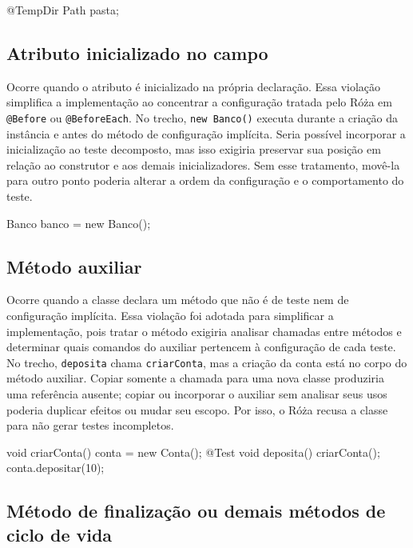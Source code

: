 \begin{violationexample}
@TempDir Path pasta;
\end{violationexample}

\subsection{Atributo inicializado no campo}

Ocorre quando o atributo é inicializado na própria declaração. Essa violação simplifica a implementação ao concentrar a configuração tratada pelo Róża em \texttt{@Before} ou \texttt{@BeforeEach}. No trecho, \texttt{new Banco()} executa durante a criação da instância e antes do método de configuração implícita. Seria possível incorporar a inicialização ao teste decomposto, mas isso exigiria preservar sua posição em relação ao construtor e aos demais inicializadores. Sem esse tratamento, movê-la para outro ponto poderia alterar a ordem da configuração e o comportamento do teste.

\begin{violationexample}
Banco banco = new Banco();
\end{violationexample}

\subsection{Método auxiliar}

Ocorre quando a classe declara um método que não é de teste nem de configuração implícita. Essa violação foi adotada para simplificar a implementação, pois tratar o método exigiria analisar chamadas entre métodos e determinar quais comandos do auxiliar pertencem à configuração de cada teste. No trecho, \texttt{deposita} chama \texttt{criarConta}, mas a criação da conta está no corpo do método auxiliar. Copiar somente a chamada para uma nova classe produziria uma referência ausente; copiar ou incorporar o auxiliar sem analisar seus usos poderia duplicar efeitos ou mudar seu escopo. Por isso, o Róża recusa a classe para não gerar testes incompletos.

\begin{violationexample}
void criarConta() { conta = new Conta(); }
@Test void deposita() {
    criarConta();
    conta.depositar(10);
}
\end{violationexample}

\subsection{Método de finalização ou demais métodos de ciclo de vida}

